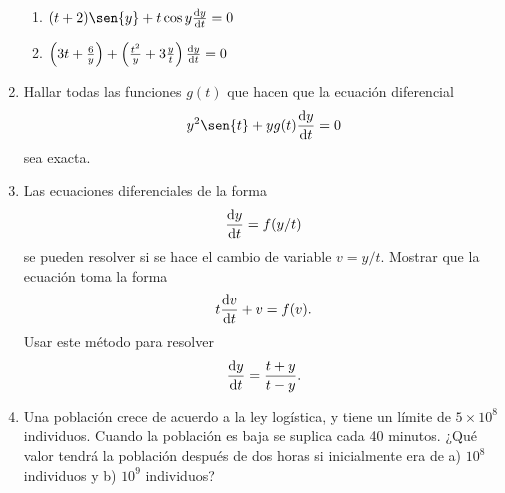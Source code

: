 \documentclass[14pt]{extarticle}
\begin{document}
\begin{enumerate}
{\begin{enumerate}
                \item {
                    $(t+2)\sen{y}+t\cos{y}\dv{y}{t}=0$

                    \color{azul}
                }
                
                \item {
                    $\left(3t+\frac{6}{y}\right)
                    +\left(\frac{t^2}{y}+3\frac{y}{t}\right)\dv{y}{t}=0$

                    \color{azul}
                }
            \end{enumerate}
        }
        
        \item {
            Hallar todas las funciones $g(t)$ que hacen que la ecuación
            diferencial $$y^2\sen{t}+yg(t)\dv{y}{t}=0$$ sea exacta.

            \color{azul}
        }
        
        \item {
            Las ecuaciones diferenciales de la forma $$\dv{y}{t}=f(y/t)$$ se
            pueden resolver si se hace el cambio de variable $v=y/t$. Mostrar
            que la ecuación toma la forma $$t\dv{v}{t}+v=f(v).$$ Usar este
            método para resolver $$\dv{y}{t}=\frac{t+y}{t-y}.$$

            \color{azul}
        }
        
        \item {
            Una población crece de acuerdo a la ley logística, y tiene un
            límite de $5\times 10^8$ individuos. Cuando la población es baja se
            suplica cada 40 minutos. ¿Qué valor tendrá la población después de
            dos horas si inicialmente era de a) $10^8$ individuos y b) $10^9$
            individuos?

            \color{azul}
        }
    \end{enumerate}
\end{document}
